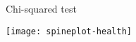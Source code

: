 \documentclass[t]{beamer}
\begin{document}
  
  \begin{frame}[c]{Chi-squared test}

    \texttt{[image: spineplot-health]}
    
  \end{frame}

  
\end{document}
